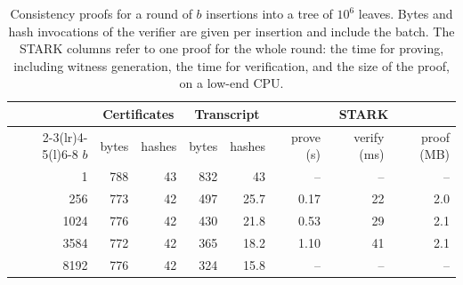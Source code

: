 \documentclass[runningheads]{llncs}
\begin{document}
\begin{table}[t]
\centering
\caption{Consistency proofs for a round of $b$ insertions into a tree of $10^6$ leaves. Bytes and hash invocations of the verifier are given per insertion and include the batch. The STARK columns refer to one proof for the whole round: the time for proving, including witness generation, the time for verification, and the size of the proof, on a low-end CPU.}\label{tab:eval}
\footnotesize
\setlength{\tabcolsep}{5pt}
\begin{tabular}{@{}r rr rr rrr@{}}
\toprule
 & \multicolumn{2}{c}{Certificates} & \multicolumn{2}{c}{Transcript} & \multicolumn{3}{c}{STARK} \\
\cmidrule(lr){2-3}\cmidrule(lr){4-5}\cmidrule(l){6-8}
$b$ & bytes & hashes & bytes & hashes & prove (s) & verify (ms) & proof (MB) \\
\midrule
1    & 788 & 43 & 832 & 43   & --   & -- & --  \\
256  & 773 & 42 & 497 & 25.7 & 0.17 & 22 & 2.0 \\
1024 & 776 & 42 & 430 & 21.8 & 0.53 & 29 & 2.1 \\
3584 & 772 & 42 & 365 & 18.2 & 1.10 & 41 & 2.1 \\
8192 & 776 & 42 & 324 & 15.8 & --   & -- & --  \\
\bottomrule
\end{tabular}
\end{table}
\end{document}
